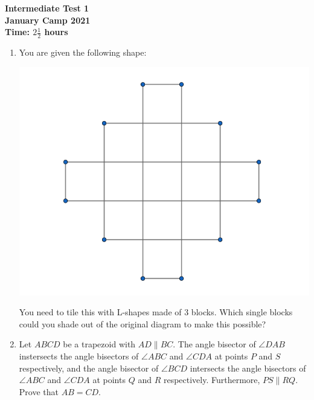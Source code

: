 \documentclass{article}
\begin{document}
\thispagestyle{empty}

\begin{center}
  \textbf{\Large Intermediate Test 1}
  \\ \vspace{1em}
  \textbf{\large January Camp 2021}
  \\ \vspace{1em}
  \textbf{\large Time: $2\frac{1}{2}$ hours}
\end{center}

\vspace{24pt}

\begin{enumerate}[1.]

\item You are given the following shape: %
	\begin{center}
	\includegraphics[scale=0.3]{Capture.png}	
	\end{center}
You need to tile this with L-shapes made of 3 blocks. Which single blocks could you shade out of the original diagram to make this possible?


\item %
Let $ABCD$ be a trapezoid with $AD \parallel BC$. The angle bisector of $\angle DAB$ instersects the angle bisectors of $\angle ABC$ and $\angle CDA$ at points $P$ and $S$ respectively, and the angle bisector of $\angle BCD$ intersects the angle bisectors of $\angle ABC$ and $\angle CDA$ at points $Q$ and $R$ respectively. Furthermore, $PS \parallel RQ$. Prove that $AB = CD$.



\end{enumerate}
\end{document}
